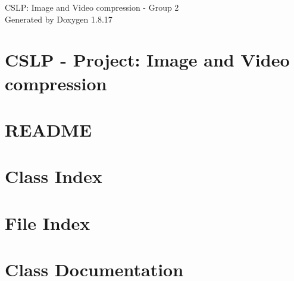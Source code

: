 \let\mypdfximage\pdfximage\def\pdfximage{\immediate\mypdfximage}\documentclass[twoside]{book}
\newcommand{\+}{\discretionary{\mbox{\scriptsize$\hookleftarrow$}}{}{}}
\newcommand{\clearemptydoublepage}{%
  \newpage{\pagestyle{empty}\cleardoublepage}%
}
\begin{document}
\hypersetup{pageanchor=false,
             bookmarksnumbered=true,
             pdfencoding=unicode
            }
\begin{titlepage}
\vspace*{7cm}
\begin{center}%
{\Large C\+S\+LP\+: Image and Video compression -\/ Group 2 }\\
\vspace*{1cm}
{\large Generated by Doxygen 1.8.17}\\
\end{center}
\end{titlepage}
\clearemptydoublepage
{}
\tableofcontents
\clearemptydoublepage
{}
\hypersetup{pageanchor=true}

\chapter{C\+S\+LP -\/ Project\+: Image and Video compression}
\label{md_README}

\chapter{R\+E\+A\+D\+ME}
\label{md_src_videoPlayer_README}

\chapter{Class Index}

\chapter{File Index}

\chapter{Class Documentation}








\end{document}

